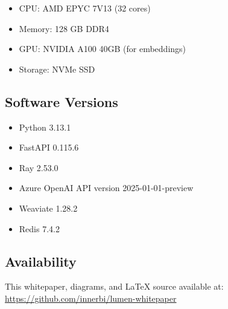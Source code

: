 \documentclass[11pt,a4paper]{article}
\theoremstyle{definition}
\theoremstyle{remark}
\begin{document}
\begin{itemize}
    \item CPU: AMD EPYC 7V13 (32 cores)
    \item Memory: 128 GB DDR4
    \item GPU: NVIDIA A100 40GB (for embeddings)
    \item Storage: NVMe SSD
\end{itemize}

\subsection{Software Versions}

\begin{itemize}
    \item Python 3.13.1
    \item FastAPI 0.115.6
    \item Ray 2.53.0
    \item Azure OpenAI API version 2025-01-01-preview
    \item Weaviate 1.28.2
    \item Redis 7.4.2
\end{itemize}

\subsection{Availability}

This whitepaper, diagrams, and LaTeX source available at:
\url{https://github.com/innerbi/lumen-whitepaper}




\end{document}
